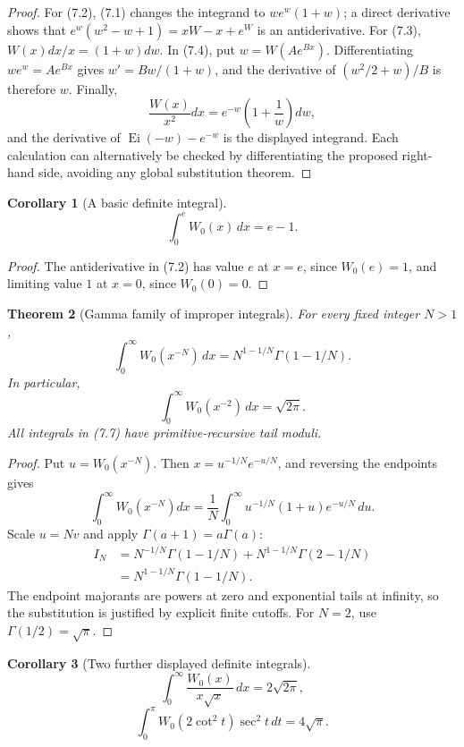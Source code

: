 \documentclass[11pt]{article}
\newtheorem{theorem}{Theorem}[section]
\newtheorem{corollary}[theorem]{Corollary}
\theoremstyle{definition}
\newcommand{\Wz}{W_0}
\newcommand{\Ei}{\operatorname{Ei}}
\begin{document}
\begin{proof}
For (7.2), (7.1) changes the integrand to
\(w e^w(1+w)\); a direct derivative shows that
\(e^w(w^2-w+1)=xW-x+e^W\) is an antiderivative.  For (7.3),
\(W(x)dx/x=(1+w)dw\).  In (7.4), put \(w=W(Ae^{Bx})\).
Differentiating \(we^w=Ae^{Bx}\) gives
\(w'=Bw/(1+w)\), and the derivative of
\((w^2/2+w)/B\) is therefore \(w\).  Finally,
\[
 \frac{W(x)}{x^2}dx=e^{-w}\left(1+\frac1w\right)dw,
\]
and the derivative of \(\Ei(-w)-e^{-w}\) is the displayed integrand.  Each
calculation can alternatively be checked by differentiating the proposed
right-hand side, avoiding any global substitution theorem.
\end{proof}

\begin{corollary}[A basic definite integral]\label{cor:0e}
\[
 \int_0^e \Wz(x)\,dx=e-1.
 \tag{7.6}
\]
\end{corollary}

\begin{proof}
The antiderivative in (7.2) has value \(e\) at \(x=e\), since \(W_0(e)=1\),
and limiting value \(1\) at \(x=0\), since \(W_0(0)=0\).
\end{proof}

\begin{theorem}[Gamma family of improper integrals]\label{thm:gamma-integrals}
For every fixed integer \(N>1\),
\[
 \int_0^\infty \Wz(x^{-N})\,dx
 =N^{1-1/N}\Gamma(1-1/N).
 \tag{7.7}
\]
In particular,
\[
 \int_0^\infty \Wz(x^{-2})\,dx=\sqrt{2\pi}.
 \tag{7.8}
\]
All integrals in (7.7) have primitive-recursive tail moduli.
\end{theorem}

\begin{proof}
Put \(u=W_0(x^{-N})\).  Then
\(x=u^{-1/N}e^{-u/N}\), and reversing the endpoints gives
\[
 \int_0^\infty W_0(x^{-N})dx
 =\frac1N\int_0^\infty
 u^{-1/N}(1+u)e^{-u/N}\,du.
\]
Scale \(u=Nv\) and apply
\(\Gamma(a+1)=a\Gamma(a)\):
\begin{align*}
 I_N
 &=N^{-1/N}\Gamma(1-1/N)
   +N^{1-1/N}\Gamma(2-1/N)\\
 &=N^{1-1/N}\Gamma(1-1/N).
\end{align*}
The endpoint majorants are powers at zero and exponential tails at infinity,
so the substitution is justified by explicit finite cutoffs.  For \(N=2\),
use \(\Gamma(1/2)=\sqrt\pi\).
\end{proof}

\begin{corollary}[Two further displayed definite integrals]\label{cor:more-integrals}
\[
 \int_0^\infty\frac{\Wz(x)}{x\sqrt{x}}\,dx=2\sqrt{2\pi},
 \tag{7.9}
\]
\[
 \int_0^\pi \Wz(2\cot^2 t)\sec^2t\,dt=4\sqrt\pi.
 \tag{7.10}
\]
\end{corollary}
\end{document}
